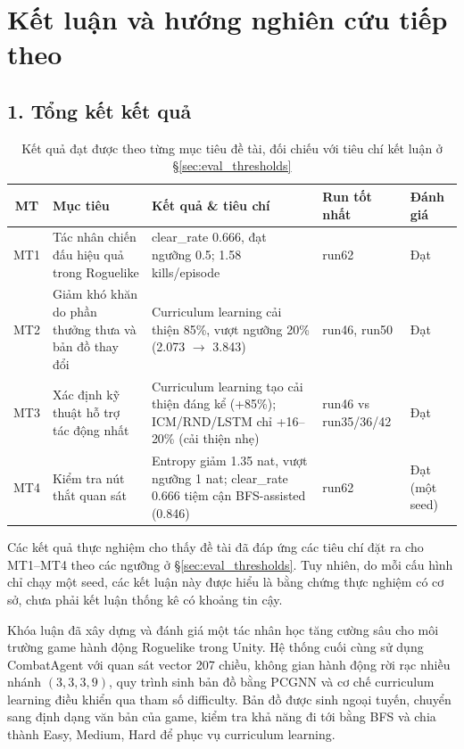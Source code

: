 \clearpage
{}


\chapter*{Kết luận và hướng nghiên cứu tiếp theo}

\section*{1. Tổng kết kết quả}

\begin{table}[H]
    \centering
    \small
    \caption{Kết quả đạt được theo từng mục tiêu đề tài, đối chiếu với tiêu chí kết luận ở §\ref{sec:eval_thresholds}}
    \label{tab:mt_results_summary}
    \begin{tabular}{|c|p{3.8cm}|p{4.0cm}|p{2.3cm}|p{1.6cm}|}
        \hline
        \textbf{MT} & \textbf{Mục tiêu} & \textbf{Kết quả \& tiêu chí} & \textbf{Run tốt nhất} & \textbf{Đánh giá} \\
        \hline
        MT1 & Tác nhân chiến đấu hiệu quả trong Roguelike & clear\_rate 0.666, đạt ngưỡng 0.5; 1.58 kills/episode & run62 & Đạt \\
        \hline
        MT2 & Giảm khó khăn do phần thưởng thưa và bản đồ thay đổi & Curriculum learning cải thiện 85\%, vượt ngưỡng 20\% (2.073 $\rightarrow$ 3.843) & run46, run50 & Đạt \\
        \hline
        MT3 & Xác định kỹ thuật hỗ trợ tác động nhất & Curriculum learning tạo cải thiện đáng kể (+85\%); ICM/RND/LSTM chỉ +16--20\% (cải thiện nhẹ) & run46 vs run35/36/42 & Đạt \\
        \hline
        MT4 & Kiểm tra nút thắt quan sát & Entropy giảm 1.35 nat, vượt ngưỡng 1 nat; clear\_rate 0.666 tiệm cận BFS-assisted (0.846) & run62 & Đạt (một seed) \\
        \hline
    \end{tabular}
\end{table}

\noindent Các kết quả thực nghiệm cho thấy đề tài đã đáp ứng các tiêu chí đặt ra cho MT1--MT4 theo các ngưỡng ở §\ref{sec:eval_thresholds}. Tuy nhiên, do mỗi cấu hình chỉ chạy một seed, các kết luận này được hiểu là bằng chứng thực nghiệm có cơ sở, chưa phải kết luận thống kê có khoảng tin cậy.

Khóa luận đã xây dựng và đánh giá một tác nhân học tăng cường sâu cho môi trường game hành động Roguelike trong Unity. Hệ thống cuối cùng sử dụng CombatAgent với quan sát vector 207 chiều, không gian hành động rời rạc nhiều nhánh $(3,3,3,9)$, quy trình sinh bản đồ bằng PCGNN và cơ chế curriculum learning điều khiển qua tham số difficulty. Bản đồ được sinh ngoại tuyến, chuyển sang định dạng văn bản của game, kiểm tra khả năng đi tới bằng BFS và chia thành Easy, Medium, Hard để phục vụ curriculum learning.

